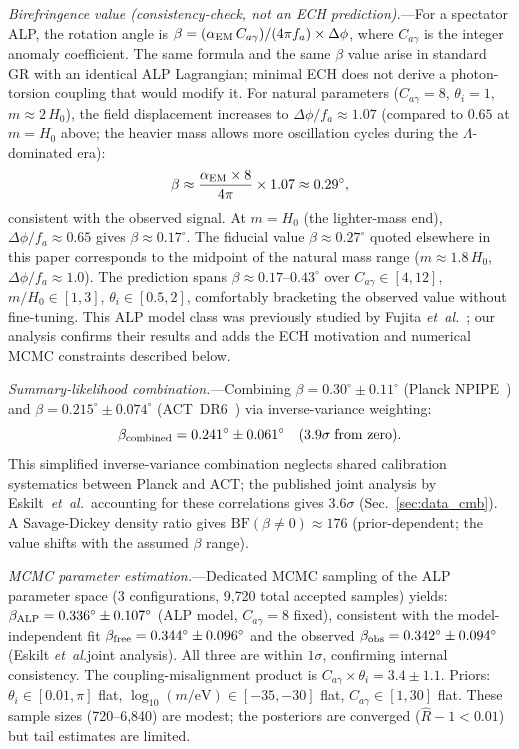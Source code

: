 \documentclass[aps,prd,twocolumn,superscriptaddress,showpacs,preprintnumbers,nofootinbib,longbibliography,floatfix]{revtex4-2}
\newcommand{\etal}{\textit{et~al.}}
\begin{document}
\textit{Birefringence value (consistency-check, not an ECH prediction).}---For a spectator ALP, the rotation angle is $\beta = (\alpha_{\rm EM}\,C_{a\gamma})/(4\pi f_a) \times \Delta\phi$, where $C_{a\gamma}$ is the integer anomaly coefficient. The same formula and the same $\beta$ value arise in standard GR with an identical ALP Lagrangian; minimal ECH does not derive a photon-torsion coupling that would modify it. For natural parameters ($C_{a\gamma} = 8$, $\theta_i = 1$, $m \approx 2\,H_0$), the field displacement increases to $\Delta\phi/f_a \approx 1.07$ (compared to $0.65$ at $m = H_0$ above; the heavier mass allows more oscillation cycles during the $\Lambda$-dominated era):
\begin{equation}
\beta \approx \frac{\alpha_{\rm EM} \times 8}{4\pi} \times 1.07 \approx 0.29^\circ,
\end{equation}
consistent with the observed signal.  At $m = H_0$ (the lighter-mass end), $\Delta\phi/f_a \approx 0.65$ gives $\beta \approx 0.17^\circ$. The fiducial value $\beta \approx 0.27^\circ$ quoted elsewhere in this paper corresponds to the midpoint of the natural mass range ($m \approx 1.8\,H_0$, $\Delta\phi/f_a \approx 1.0$). The prediction spans $\beta \approx 0.17$--$0.43^\circ$ over $C_{a\gamma} \in [4,12]$, $m/H_0 \in [1,3]$, $\theta_i \in [0.5,2]$, comfortably bracketing the observed value without fine-tuning. This ALP model class was previously studied by Fujita \etal~\cite{Fujita2021}; our analysis confirms their results and adds the ECH motivation and numerical MCMC constraints described below.

\textit{Summary-likelihood combination.}---Combining $\beta = 0.30^\circ \pm 0.11^\circ$ (Planck NPIPE~\cite{Eskilt2022}) and $\beta = 0.215^\circ \pm 0.074^\circ$ (ACT~DR6~\cite{DiegoPalazuelos2025}) via inverse-variance weighting:
\begin{equation}
\beta_{\rm combined} = 0.241^\circ \pm 0.061^\circ \quad (3.9\sigma\;\text{from zero}).
\end{equation}
This simplified inverse-variance combination neglects shared calibration systematics between Planck and ACT; the published joint analysis by Eskilt~\etal\ accounting for these correlations gives $3.6\sigma$ (Sec.~\ref{sec:data_cmb}). A Savage-Dickey density ratio gives $\mathrm{BF}(\beta \neq 0) \approx 176$ (prior-dependent; the value shifts with the assumed $\beta$ range).

\textit{MCMC parameter estimation.}---Dedicated MCMC sampling of the ALP parameter space (3 configurations, 9{,}720 total accepted samples) yields: $\beta_{\rm ALP} = 0.336^\circ \pm 0.107^\circ$ (ALP model, $C_{a\gamma} = 8$ fixed), consistent with the model-independent fit $\beta_{\rm free} = 0.344^\circ \pm 0.096^\circ$ and the observed $\beta_{\rm obs} = 0.342^\circ \pm 0.094^\circ$ (Eskilt \etal joint analysis). All three are within $1\sigma$, confirming internal consistency. The coupling-misalignment product is $C_{a\gamma} \times \theta_i = 3.4 \pm 1.1$. Priors: $\theta_i \in [0.01, \pi]$ flat, $\log_{10}(m/\text{eV}) \in [-35, -30]$ flat, $C_{a\gamma} \in [1, 30]$ flat. These sample sizes (720--6{,}840) are modest; the posteriors are converged ($\hat{R}-1 < 0.01$) but tail estimates are limited.
\end{document}
